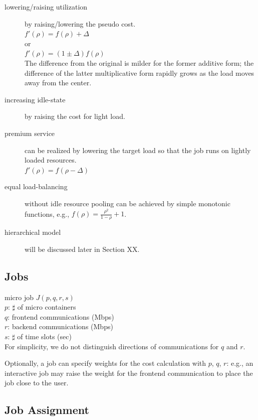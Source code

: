 \begin{description}
  \item[lowering/raising utilization] by raising/lowering the pseudo cost. \\
        $f'(\rho) = f(\rho) + \Delta$ \\
        or \\
        $f'(\rho) = (1 \pm \Delta)f(\rho)$ \\
        The difference from the original is milder for the former additive
        form; the difference of the latter multiplicative form rapidly grows
        as the load moves away from the center.

  \item[increasing idle-state] by raising the cost for light load.
  \item[premium service] can be realized by lowering the target load so
        that the job runs on lightly loaded resources. \\
        $f'(\rho) = f(\rho - \Delta)$
  \item[equal load-balancing] without idle resource pooling can be
        achieved by simple monotonic functions, e.g.,
        $f(\rho) = \frac{\rho^{2}}{1 - \rho} + 1$.
  \item[hierarchical model] will be discussed later in Section XX.
\end{description}

\subsection{Jobs}

micro job $J(p, q, r, s)$	\\
$p$: $\sharp$ of micro containers	\\
$q$: frontend communications (Mbps)	\\
$r$: backend communications (Mbps)	\\
$s$: $\sharp$ of time slots (sec)	\\

For simplicity, we do not distinguish directions of communications for $q$ and $r$.

Optionally, a job can specify weights for the cost calculation with $p$, $q$, $r$:
e.g., an interactive job may raise the weight for the frontend
communication to place the job close to the user.

\subsection{Job Assignment}

